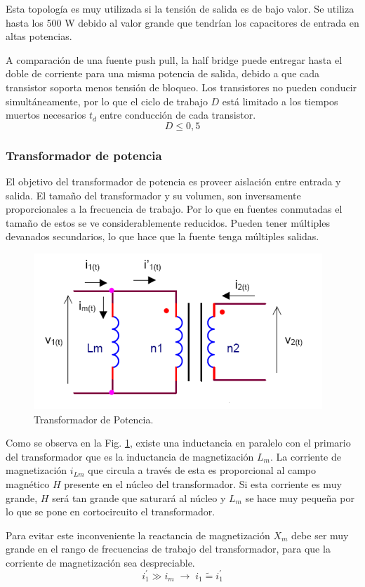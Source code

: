 \documentclass[11pt, a4paper]{article}
\begin{document}
Esta topología es muy utilizada si la tensión de salida es de bajo valor. Se utiliza hasta los 500 W debido al valor grande que tendrían los capacitores de entrada en altas potencias.

A comparación de una fuente push pull, la half bridge puede entregar hasta el doble de corriente para una misma potencia de salida, debido a que cada transistor soporta menos tensión de bloqueo. Los transistores no pueden conducir simultáneamente, por lo que el ciclo de trabajo $D$ está limitado a los tiempos muertos necesarios $t_d$ entre conducción de cada transistor.
\[ D \leq 0,5 \]

\subsubsection{Transformador de potencia}
El objetivo del transformador de potencia es proveer aislación entre entrada y salida. El tamaño del transformador y su volumen, son inversamente proporcionales a la frecuencia de trabajo. Por lo que en fuentes conmutadas el tamaño de estos se ve considerablemente reducidos. Pueden tener múltiples devanados secundarios, lo que hace que la fuente tenga múltiples salidas.

\begin{figure}[h]
	\centering
	\includegraphics[width = 10 cm]{Imagenes/trafo}
	\caption{Transformador de Potencia.}
	\label{trafo}
\end{figure}

Como se observa en la Fig. \ref{trafo}, existe una inductancia en paralelo con el primario del transformador que es la inductancia de magnetización $L_m$. La corriente de magnetización $i_{Lm}$ que circula a través de esta es proporcional al campo magnético $H$ presente en el núcleo del transformador. Si esta corriente es muy grande, $H$ será tan grande que saturará al núcleo y $L_m$ se hace muy pequeña por lo que se pone en cortocircuito el transformador.

Para evitar este inconveniente la reactancia de magnetización $X_m$ debe ser muy grande en el rango de frecuencias de trabajo del transformador, para que la corriente de magnetización sea despreciable.
\[ i_{1}^{'} \gg i_m \; \rightarrow \; i_1 \tilde{=}  i_{1}^{'}  \]  
\end{document}
